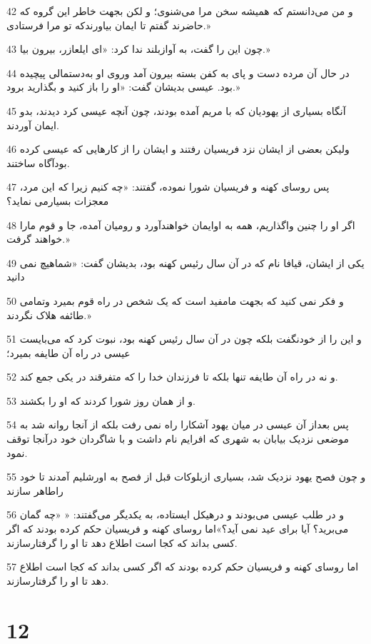 \par 42 و من می‌دانستم که همیشه سخن مرا می‌شنوی؛ و لکن بجهت خاطر این گروه که حاضرند گفتم تا ایمان بیاورندکه تو مرا فرستادی.»
\par 43 چون این را گفت، به آوازبلند ندا کرد: «ای ایلعازر، بیرون بیا.»
\par 44 در حال آن مرده دست و پای به کفن بسته بیرون آمد وروی او به‌دستمالی پیچیده بود. عیسی بدیشان گفت: «او را باز کنید و بگذارید برود.»
\par 45 آنگاه بسیاری از یهودیان که با مریم آمده بودند، چون آنچه عیسی کرد دیدند، بدو ایمان آوردند.
\par 46 ولیکن بعضی از ایشان نزد فریسیان رفتند و ایشان را از کارهایی که عیسی کرده بودآگاه ساختند.
\par 47 پس روسای کهنه و فریسیان شورا نموده، گفتند: «چه کنیم زیرا که این مرد، معجزات بسیارمی نماید؟
\par 48 اگر او را چنین واگذاریم، همه به اوایمان خواهند‌آورد و رومیان آمده، جا و قوم مارا خواهند گرفت.»
\par 49 یکی از ایشان، قیافا نام که در آن سال رئیس کهنه بود، بدیشان گفت: «شماهیچ نمی دانید
\par 50 و فکر نمی کنید که بجهت مامفید است که یک شخص در راه قوم بمیرد وتمامی طائفه هلاک نگردند.»
\par 51 و این را از خودنگفت بلکه چون در آن سال رئیس کهنه بود، نبوت کرد که می‌بایست عیسی در راه آن طایفه بمیرد؛
\par 52 و نه در راه آن طایفه تنها بلکه تا فرزندان خدا را که متفرقند در یکی جمع کند.
\par 53 و از همان روز شورا کردند که او را بکشند.
\par 54 پس بعداز آن عیسی در میان یهود آشکارا راه نمی رفت بلکه از آنجا روانه شد به موضعی نزدیک بیابان به شهری که افرایم نام داشت و با شاگردان خود درآنجا توقف نمود.
\par 55 و چون فصح یهود نزدیک شد، بسیاری ازبلوکات قبل از فصح به اورشلیم آمدند تا خود راطاهر سازند
\par 56 و در طلب عیسی می‌بودند و درهیکل ایستاده، به یکدیگر می‌گفتند: « «چه گمان می‌برید؟ آیا برای عید نمی آید؟»اما روسای کهنه و فریسیان حکم کرده بودند که اگر کسی بداند که کجا است اطلاع دهد تا او را گرفتارسازند.
\par 57 اما روسای کهنه و فریسیان حکم کرده بودند که اگر کسی بداند که کجا است اطلاع دهد تا او را گرفتارسازند.

\chapter{12}

